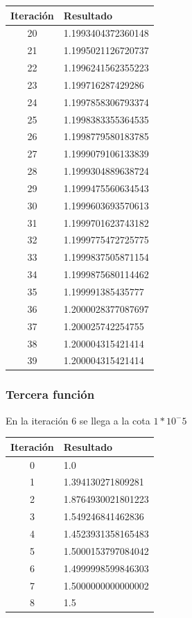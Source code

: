 \documentclass[titlepage,a4paper]{article}
\begin{document}
\begin{multicols}{2}
\begin{center}
\begin{tabular}{| c | l |}
                \hline
        \end{tabular}
    \end{center}
    \begin{center}
        \begin{tabular}{| c | l |}
        \hline
         Iteración & Resultado \\ \hline
20     &  1.1993404372360148 \\
21     &  1.1995021126720737 \\
22     &  1.1996241562355223 \\
23     &  1.199716287429286 \\
24     &  1.1997858306793374 \\
25     &  1.1998383355364535 \\
26     &  1.1998779580183785 \\
27     &  1.1999079106133839 \\
28     &  1.1999304889638724 \\
29     &  1.1999475560634543 \\
30     &  1.1999603693570613 \\
31     &  1.1999701623743182 \\
32     &  1.1999775472725775 \\
33     &  1.1999837505871154 \\
34     &  1.1999875680114462 \\
35     &  1.199991385435777 \\
36     &  1.2000028377087697 \\
37     &  1.200025742254755 \\
38     &  1.200004315421414 \\
39     &  1.200004315421414 \\
        \hline
        \end{tabular}
    \end{center}
\end{multicols}

\subsubsection{Tercera función}\label{sec:sec3}
En la iteración 6 se llega a la cota $1*10^-5$
\begin{center}
\begin{tabular}{| c | l  |}
    \hline
     Iteración & Resultado \\ \hline
  0     &  1.0 \\
1     &  1.394130271809281 \\
2     &  1.8764930021801223 \\
3     &  1.549246841462836 \\
4     &  1.4523931358165483 \\
5     &  1.5000153797084042 \\
6     &  1.4999998599846303 \\
7     &  1.5000000000000002 \\
8     &  1.5 \\
    \hline
    \end{tabular}
\end{center}
\end{document}
